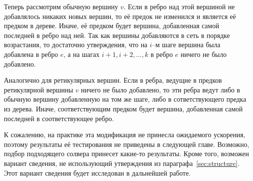 

Теперь рассмотрим обычную вершину $v$.
Если в ребро над этой вершиной не добавлялось никаких новых вершин, то её предок не изменился и является её предком в дереве.
Иначе, её предком будет вершина, добавленная самой последней в ребро над ней.
Так как вершины добавляются в сеть в порядке возрастания, то достаточно утверждения, что на $i$--м шаге вершина была добавлена в ребро $e$, а на шагах $i+1, i+2, \dots , k$ в ребро $e$ ничего не было добавлено.

Аналогично для ретикулярных вершин.
Если в ребра, ведущие в предков ретикулярной вершины $v$ ничего не было добавлено, то эти ребра ведут либо в обычную вершину добавленную на том же шаге, либо в сответствующего предка из дерева.
Иначе, соответствующим предком будет вершина, добавленная самой последней в соответствующее ребро.

К сожалению, на практике эта модификация не принесла ожидаемого ускорения, поэтому результаты её тестирования не приведены в следующей главе.
Возможно, подбор подходящего солвера принесет какие-то результаты.
Кроме того, возможен вариант сведения, не использующий утверждения из параграфа~\ref{sec:structure}.
Этот вариант сведения будет исследован в дальнейшей работе.

